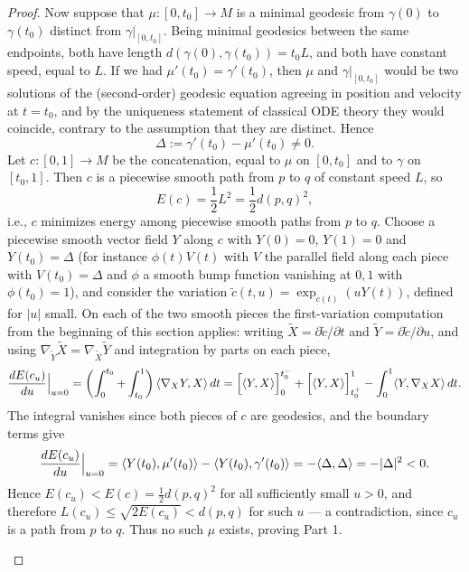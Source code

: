 \begin{proof}
Now suppose that $\mu\colon [0,t_0]\to M$ is a minimal geodesic from
$\gamma(0)$ to $\gamma(t_0)$ distinct from $\gamma|_{[0,t_0]}$. Being
minimal geodesics between the same endpoints, both have length
$d(\gamma(0),\gamma(t_0))=t_0L$, and both have constant speed, equal
to $L$. If we had $\mu'(t_0)=\gamma'(t_0)$, then $\mu$ and
$\gamma|_{[0,t_0]}$ would be two solutions of the (second-order)
geodesic equation agreeing in position and velocity at $t=t_0$, and
by the uniqueness statement of classical ODE theory they would
coincide, contrary to the assumption that they are distinct. Hence
$$\Delta:=\gamma'(t_0)-\mu'(t_0)\not=0.$$
Let $c\colon [0,1]\to M$ be the concatenation, equal to $\mu$ on
$[0,t_0]$ and to $\gamma$ on $[t_0,1]$. Then $c$ is a piecewise
smooth path from $p$ to $q$ of constant speed $L$, so
$$E(c)=\frac{1}{2}L^2=\frac{1}{2}d(p,q)^2,$$
i.e., $c$ minimizes energy among piecewise smooth paths from $p$ to
$q$. Choose a piecewise smooth vector field $Y$ along $c$ with
$Y(0)=0$, $Y(1)=0$ and $Y(t_0)=\Delta$ (for instance $\phi(t)V(t)$
with $V$ the parallel field along each piece with
$V(t_0)=\Delta$ and $\phi$ a smooth bump function vanishing at $0,1$
with $\phi(t_0)=1$), and consider the variation
$\tilde c(t,u)=\exp_{c(t)}(uY(t))$, defined for $|u|$ small. On each
of the two smooth pieces the first-variation computation from the
beginning of this section applies: writing $\widetilde X=\partial
\tilde c/\partial t$ and $\widetilde Y=\partial\tilde c/\partial u$,
and using $\nabla_{\widetilde Y}\widetilde X=\nabla_{\widetilde
X}\widetilde Y$ and integration by parts on each piece,
$$\frac{dE(c_u)}{du}\Bigl|_{u=0}\Bigr.
=\left(\int_0^{t_0}+\int_{t_0}^1\right)
\langle\nabla_{X}Y,X\rangle\,dt
=\Bigl[\langle Y,X\rangle\Bigr]_0^{t_0^-}
+\Bigl[\langle Y,X\rangle\Bigr]_{t_0^+}^{1}
-\int_0^1\langle Y,\nabla_XX\rangle\,dt.$$
The integral vanishes since both pieces of $c$ are geodesics, and
the boundary terms give
$$\frac{dE(c_u)}{du}\Bigl|_{u=0}\Bigr.
=\langle Y(t_0),\mu'(t_0)\rangle-\langle
Y(t_0),\gamma'(t_0)\rangle=-\langle \Delta,\Delta\rangle
=-|\Delta|^2<0.$$
Hence $E(c_u)<E(c)=\frac{1}{2}d(p,q)^2$ for all sufficiently small
$u>0$, and therefore $L(c_u)\le\sqrt{2E(c_u)}<d(p,q)$ for such $u$
--- a contradiction, since $c_u$ is a path from $p$ to $q$. Thus no
such $\mu$ exists, proving Part 1.

\begin{remark}
\label{rem:part1-corner-rigidity-route}




\end{remark}
\end{proof}
